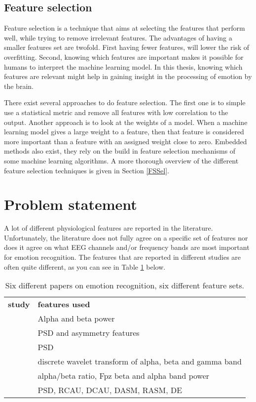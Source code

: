 
\subsection{Feature selection}
Feature selection is a technique that aims at selecting the features that perform well, while trying to remove irrelevant features\citep{rfPaper}. The advantages of having a smaller features set are twofold. First having fewer features, will lower the risk of overfitting\citep{rfPaper}. Second, knowing which features are important makes it possible for humans to interpret the machine learning model. In this thesis, knowing which features are relevant might help in gaining insight in the processing of emotion by the brain. 

\clearpage

There exist several approaches to do feature selection. The first one is to simple use a statistical metric and remove all features with low correlation to the output. Another approach is to look at the weights of a model. When a machine learning model gives a large weight to a feature, then that feature is considered more important than a feature with an assigned weight close to zero. Embedded methods also exist, they rely on the build in feature selection mechanisms of some machine learning algorithms. A more thorough  overview of the different feature selection techniques is given in Section \ref{FSSel}. 

\section{Problem statement}

A lot of different physiological features are reported in the literature. Unfortunately, the literature does not fully agree on a specific set of features nor does it agree on what EEG channels and/or frequency bands are most important for emotion recognition. The features that are reported in different studies are often quite different, as you can see in Table \ref{diffFeat} below.

\begin{table}[H]
\centering
\caption{Six different papers on emotion recognition, six different feature sets\label{diffFeat}.}
\begin{tabular}{ll}
\textbf{study} & \textbf{features used}                         \\
\citep{ref4}     & Alpha and beta power                           \\
\citep{ref7}     & PSD and asymmetry features                     \\
\citep{ref8}     & PSD                                            \\
\citep{ref6}     & discrete wavelet transform of alpha, beta and gamma band \\
\citep{ExtendedPaper}	&	alpha/beta ratio, Fpz beta and alpha band power \\
\citep{killyPaper} & PSD, RCAU, DCAU, DASM, RASM, DE \\
\end{tabular}
\end{table}


